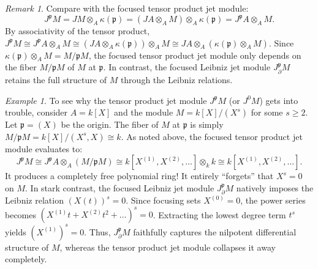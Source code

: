 \documentclass[a4paper, 12pt]{amsart}
\theoremstyle{definition}
\theoremstyle{remark}
\newtheorem{remark}[theorem]{Remark}
\newtheorem{example}[theorem]{Example}
\begin{document}
\begin{remark}
  Compare with the focused tensor product jet module:
  \begin{equation*}
    J^\mathfrak{p}M = JM \otimes_A \kappa(\mathfrak{p}) = (JA \otimes_A M) \otimes_A \kappa(\mathfrak{p}) = J^\mathfrak{p}A \otimes_A M.
  \end{equation*}
  By associativity of the tensor product,
  $J^\mathfrak{p}M \cong J^\mathfrak{p}A \otimes_A M \cong (JA \otimes_A \kappa(\mathfrak{p})) \otimes_A M \cong JA \otimes_A (\kappa(\mathfrak{p}) \otimes_A M)$.
  Since $\kappa(\mathfrak{p}) \otimes_A M = M/\mathfrak{p}M$,
  the focused tensor product jet module only depends on the fiber $M/\mathfrak{p}M$ of $M$ at $\mathfrak{p}$.
  In contrast, the focused Leibniz jet module $J^\mathfrak{p}_\partial M$ retains the full
  structure of $M$ through the Leibniz relations.
\end{remark}

\begin{example}
  To see why the tensor product jet module $J^\mathfrak{p}M$ (or $J^0M$) gets into trouble, consider $A = k[X]$ and the module $M = k[X]/(X^s)$ for some $s \ge 2$. Let $\mathfrak{p} = (X)$ be the origin. 
  The fiber of $M$ at $\mathfrak{p}$ is simply $M/\mathfrak{p}M = k[X]/(X^s, X) \cong k$. 
  As noted above, the focused tensor product jet module evaluates to:
  \begin{equation*}
    J^\mathfrak{p}M \cong J^\mathfrak{p}A \otimes_A (M/\mathfrak{p}M) \cong k[X^{(1)}, X^{(2)}, \dots] \otimes_k k \cong k[X^{(1)}, X^{(2)}, \dots].
  \end{equation*}
  It produces a completely free polynomial ring! It entirely ``forgets'' that $X^s = 0$ on $M$. 
  In stark contrast, the focused Leibniz jet module $J^\mathfrak{p}_\partial M$ natively imposes the Leibniz relation $(X(t))^s = 0$. Since focusing sets $X^{(0)} = 0$, the power series becomes $(X^{(1)}t + X^{(2)}t^2 + \dots)^s = 0$. Extracting the lowest degree term $t^s$ yields $(X^{(1)})^s = 0$. Thus, $J^\mathfrak{p}_\partial M$ faithfully captures the nilpotent differential structure of $M$, whereas the tensor product jet module collapses it away completely.
\end{example}
\end{document}
